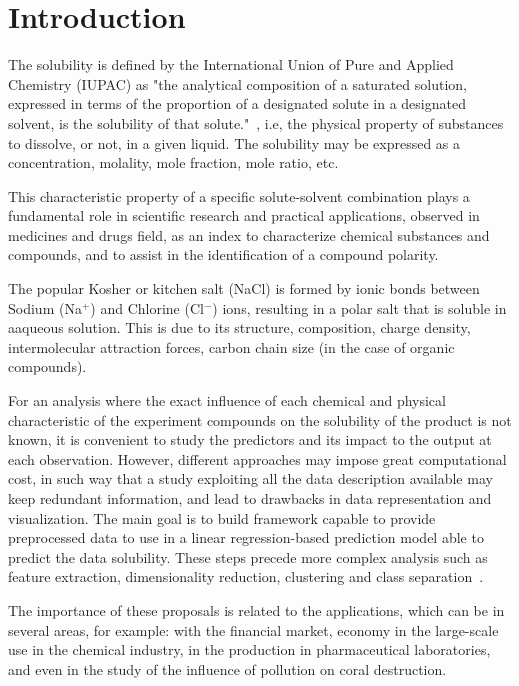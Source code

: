 \section{Introduction}

The solubility is defined by the International Union of Pure and Applied Chemistry (IUPAC) as "the analytical composition of a saturated solution, expressed in terms of the proportion of a designated solute in a designated solvent, is the solubility of that solute."~\cite{Book1}, i.e, the physical property of substances to dissolve, or not, in a given liquid. The solubility may be expressed as a concentration, molality, mole fraction, mole ratio, etc. 

This characteristic property of a specific solute-solvent combination plays a fundamental role in scientific research and practical applications, observed in medicines and drugs field, as an index to characterize chemical substances and compounds, and to assist in the identification of a compound polarity.

The popular Kosher or kitchen salt (NaCl) is formed by ionic bonds between Sodium (Na$^+$) and Chlorine (Cl$^-$) ions, resulting in a polar salt that is soluble in aaqueous solution. This is due to its structure, composition, charge density, intermolecular attraction forces, carbon chain size (in the case of organic compounds).

For an analysis where the exact influence of each chemical and physical characteristic of the experiment compounds on the solubility of the product is not known, it is convenient to study the predictors and its impact to the output at each observation. However, different approaches may impose great computational cost, in such way that a study exploiting all the data description available may keep redundant information, and lead to drawbacks in data representation and visualization. The main goal is to build framework capable to provide preprocessed data to use in a linear regression-based prediction model able to predict the data solubility. These steps precede more complex analysis such as feature extraction, dimensionality reduction, clustering and class separation~\cite{Hastie2009, Kuhn2013, James2013}.

The importance of these proposals is related to the applications, which can be in several areas, for example: with the financial market, economy in the large-scale use in the chemical industry, in the production in pharmaceutical laboratories, and even in the study of the influence of pollution on coral destruction.

